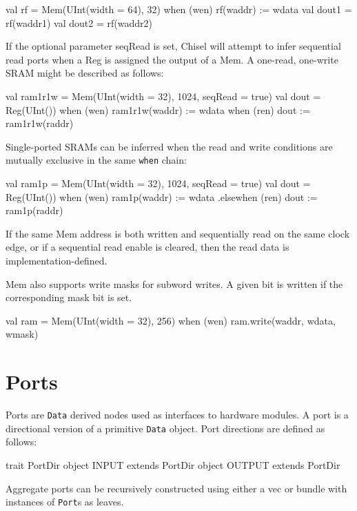 \documentclass[10pt,twocolumn]{article}
\def\code#1{{\small\tt #1}}
\begin{document}
\begin{scala}
val rf = Mem(UInt(width = 64), 32)
when (wen) { rf(waddr) := wdata }
val dout1 = rf(waddr1)
val dout2 = rf(waddr2)
\end{scala}

If the optional parameter seqRead is set, Chisel will attempt to infer
sequential read ports when a Reg is assigned the output of a Mem.  A one-read,
one-write SRAM might be described as follows:

\begin{scala}
val ram1r1w =
  Mem(UInt(width = 32), 1024, seqRead = true)
val dout = Reg(UInt())
when (wen) { ram1r1w(waddr) := wdata }
when (ren) { dout := ram1r1w(raddr) }
\end{scala}

Single-ported SRAMs can be inferred when the read and write conditions are
mutually exclusive in the same \code{when} chain:

\begin{scala}
val ram1p = 
  Mem(UInt(width = 32), 1024, seqRead = true)
val dout = Reg(UInt())
when (wen) { ram1p(waddr) := wdata }
.elsewhen (ren) { dout := ram1p(raddr) }
\end{scala}

If the same Mem address is both written and sequentially read on the same clock
edge, or if a sequential read enable is cleared, then the read data is
implementation-defined.

Mem also supports write masks for subword writes.  A given bit is written if
the corresponding mask bit is set.

\begin{scala}
val ram = Mem(UInt(width = 32), 256)
when (wen) { ram.write(waddr, wdata, wmask) }
\end{scala}

\section{Ports}
\label{sec:ports}

Ports are \code{Data} derived nodes used as interfaces to hardware
modules.   A port is a directional version of a primitive
\code{Data} object.  Port directions are defined as follows:

\begin{scala}
trait PortDir
object INPUT  extends PortDir
object OUTPUT extends PortDir
\end{scala}

\noindent
Aggregate ports can be recursively constructed using either a vec or
bundle with instances of \code{Port}s as leaves.  
\end{document}

